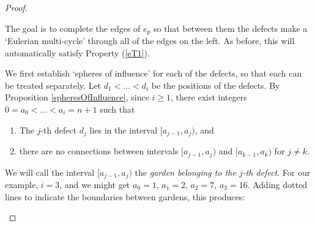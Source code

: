 \documentclass[12pt]{amsart}
\theoremstyle{plain}
\theoremstyle{definition} \newtheorem{definition}[theorem]{Definition}
\theoremstyle{plain}
\theoremstyle{plain} \newtheorem{proposition}[theorem]{Proposition}
\theoremstyle{plain} \newtheorem{conjecture}[theorem]{Conjecture}
\theoremstyle{plain} \newtheorem{corollary}[theorem]{Corollary}
\theoremstyle{remark} \newtheorem{claim}[theorem]{Claim}
\theoremstyle{remark} \newtheorem{remark}[theorem]{Remark}
\theoremstyle{remark} \newtheorem{example}[theorem]{Example}
\theoremstyle{remark} \newtheorem{comment}[theorem]{Comment}
\theoremstyle{definition} \newtheorem{question}[theorem]{Question}
\begin{document}
\begin{proof}
\begin{center}
\quad
\end{center}

The goal is to complete the edges of $e_p$ so that between them the defects make a `Eulerian multi-cycle' through all of the edges on the left. As before, this will automatically satisfy Property (\ref{eT1}).

We first establish `spheres of influence' for each of the defects, so that each can be treated separately. Let $d_1 < \dots < d_i$ be the positions of the defects. By Proposition \ref{spheresOfInfluence}, since $i \geq 1$, there exist integers $0=a_0< \dots < a_i=n+1$ such that \begin{enumerate}
    \item The $j$-th defect $d_j$ lies in the interval $[a_{j-1},a_j)$, and
    \item there are no connections between intervals $[a_{j-1},a_j)$ and $[a_{k-1},a_k)$ for $j \neq k$.
\end{enumerate}
We will call the interval $[a_{j-1},a_j)$ the \emph{garden belonging to the $j$-th defect}. For our example, $i=3$, and we might get $a_0 = 1$, $a_1=2$, $a_2=7$, $a_3=16$. Adding dotted lines to indicate the boundaries between gardens, this produces:
\begin{center}
\quad
\begin{tikzpicture}[x=1.5cm,y=-.5cm,baseline=-1.05cm]


\end{tikzpicture}
\end{center}
\end{proof}
\end{document}

